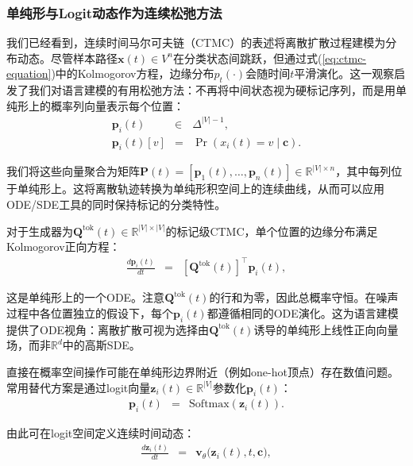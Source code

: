 \subsubsection{单纯形与Logit动态作为连续松弛方法}

我们已经看到，连续时间马尔可夫链（CTMC）的表述将离散扩散过程建模为分布动态。尽管样本路径$\mathbf{x}(t)\in V^n$在分类状态间跳跃，但通过式(\ref{eq:ctmc-equation})中的Kolmogorov方程，边缘分布$p_t(\cdot)$会随时间$t$平滑演化。这一观察启发了我们对语言建模的有用松弛方法：不再将中间状态视为硬标记序列，而是用单纯形上的概率列向量表示每个位置：
\begin{eqnarray}
\mathbf{p}_i(t) & \in & \Delta^{|V|-1}, \\
\mathbf{p}_i(t)[v] & = & \Pr(x_i(t)=v \mid \mathbf{c}).
\end{eqnarray}

\noindent 我们将这些向量聚合为矩阵$\mathbf{P}(t) = [\mathbf{p}_1(t), \dots, \mathbf{p}_n(t)] \in \mathbb{R}^{|V| \times n}$，其中每列位于单纯形上。这将离散轨迹转换为单纯形积空间上的连续曲线，从而可以应用ODE/SDE工具的同时保持标记的分类特性。

对于生成器为$\mathbf{Q}^{\mathrm{tok}}(t) \in \mathbb{R}^{|V| \times |V|}$的标记级CTMC，单个位置的边缘分布满足Kolmogorov正向方程：
\begin{eqnarray}
\frac{d \mathbf{p}_i(t)}{dt} & = & \left[ \mathbf{Q}^{\mathrm{tok}}(t) \right]^\top \mathbf{p}_i(t),
\label{eq:simplex-forward-ode}
\end{eqnarray}

\noindent 这是单纯形上的一个ODE。注意$\mathbf{Q}^{\mathrm{tok}}(t)$的行和为零，因此总概率守恒。在噪声过程中各位置独立的假设下，每个$\mathbf{p}_i(t)$都遵循相同的ODE演化。这为语言建模提供了ODE视角：离散扩散可视为选择由$\mathbf{Q}^{\mathrm{tok}}(t)$诱导的单纯形上线性正向向量场，而非$\mathbb{R}^d$中的高斯SDE。

直接在概率空间操作可能在单纯形边界附近（例如one-hot顶点）存在数值问题。常用替代方案是通过logit向量$\mathbf{z}_i(t)\in\mathbb{R}^{|V|}$参数化$\mathbf{p}_i(t)$：
\begin{eqnarray}
\mathbf{p}_i(t) & = &\mathrm{Softmax}(\mathbf{z}_i(t)).
\end{eqnarray}

\noindent 由此可在logit空间定义连续时间动态：
\begin{eqnarray}
\frac{d \mathbf{z}_i(t)}{dt} & = & \mathbf{v}_{\theta} \big(\mathbf{z}_i(t),t,\mathbf{c}\big),
\label{eq:logit-ode}
\end{eqnarray}

